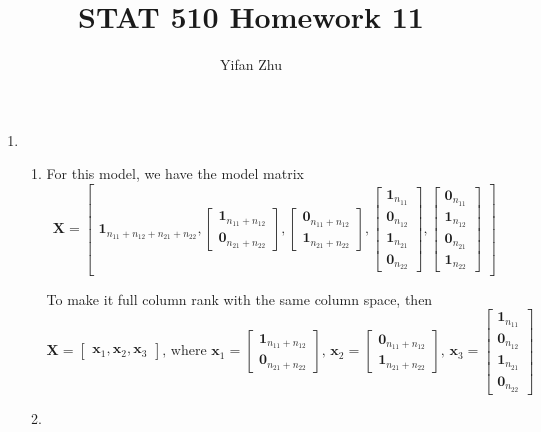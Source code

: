 \documentclass{article}
\begin{document}
\setcounter{MaxMatrixCols}{20}



\title{STAT 510 Homework 11}
\author{Yifan Zhu}
\maketitle

\begin{enumerate}[leftmargin = 0 em, label = \arabic*., font = \bfseries]
	\item
	\begin{enumerate}
		\item 

	For this model, we have the model matrix 
	\[\bm X = \begin{bmatrix}
		\bm 1_{n_{11} + n_{12} + n_{21} +n_{22}}, \begin{bmatrix}
			\bm 1_{n_{11} + n_{12}}\\
			\bm 0_{n_{21} + n_{22}}
		\end{bmatrix},\begin{bmatrix}
			\bm 0_{n_{11} + n_{12}}\\
			\bm 1_{n_{21} + n_{22}}
		\end{bmatrix}, \begin{bmatrix}
			\bm 1_{n_{11}}\\ \bm 0_{n_{12}} \\ \bm 1_{n_{21}} \\ \bm 0_{n_{22}}
		\end{bmatrix}, \begin{bmatrix}
			\bm 0_{n_{11}}\\ \bm 1_{n_{12}} \\ \bm 0_{n_{21}} \\ \bm 1_{n_{22}}
		\end{bmatrix}
	\end{bmatrix}\]

	To make it full column rank with the same column space, then 
	\[\bm X = \begin{bmatrix}
		\bm x_1 , \bm x_2, \bm x_3
	\end{bmatrix},\, \textrm{where $\bm x_1 = \begin{bmatrix}
		\bm 1_{n_{11} + n_{12}}\\ \bm 0_{n_{21} + n_{22}}
	\end{bmatrix},\, \bm x_2 =\begin{bmatrix}
		\bm 0_{n_{11} + n_{12}}\\ \bm 1_{n_{21} + n_{22}}
	\end{bmatrix} ,\, \bm x_3 = \begin{bmatrix}
		\bm 1_{n_{11}} \\ \bm 0_{n_{12}} \\ \bm 1_{n_{21}} \\ \bm 0_{n_{22}}
	\end{bmatrix}$}\]
	\item 


\end{enumerate}
\end{enumerate}
\end{document}
